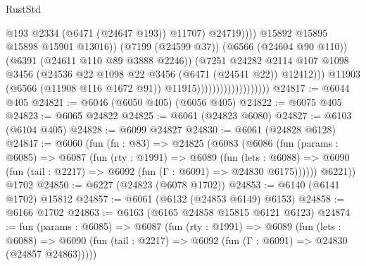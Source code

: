 \begin{lexlean}{RustStd}
\begin{coremodule}
                                                          @193
                                                          @2334
                                                          (@6471 (@24647 @193))
                                                          @11707)
                                                        @24719))))
                                                @15892
                                                @15895
                                                @15898
                                                @15901
                                                @13016))
                                            (@7199 (@24599 @37))
                                            (@6566 (@24604 @90 @110))
                                            (@6391 (@24611 @110 @89 @3888 @2246))
                                            (@7251
                                              @24282
                                              @2114
                                              @107
                                              @1098
                                              @3456
                                              (@24536
                                                @22
                                                @1098
                                                @22
                                                @3456
                                                (@6471 (@24541 @22))
                                                @12412)))
                                          @11903
                                          (@6566 (@11908 @116 @1672 @91))
                                          @11915)))))))))))))))))))
@24817 := @6044 @405
@24821 := @6046 (@6050 @405) (@6056 @405)
@24822 := @6075 @405
@24823 := @6065 @24822
@24825 := @6061 (@24823 @6080)
@24827 := @6103 (@6104 @405)
@24828 := @6099 @24827
@24830 := @6061 (@24828 @6128)
@24847 := @6060
    (fun (fn : @83) =>
    @24825
      (@6083
        (@6086
          (fun (params : @6085) =>
          @6087
            (fun (rty : @1991) =>
            @6089
              (fun (lets : @6088) =>
              @6090 (fun (tail : @2217) => @6092 (fun (Γ : @6091) => @24830 @6175))))))
        @6221))
    @1702
@24850 := @6227 (@24823 (@6078 @1702))
@24853 := @6140 (@6141 @1702) @15812
@24857 := @6061 (@6132 (@24853 @6149) @6153)
@24858 := @6166 @1702
@24863 := @6163 (@6165 @24858 @15815 @6121 @6123)
@24874 := fun (params : @6085) =>
  @6087
    (fun (rty : @1991) =>
    @6089
      (fun (lets : @6088) =>
      @6090 (fun (tail : @2217) => @6092 (fun (Γ : @6091) => @24830 (@24857 @24863)))))

\end{coremodule}
\end{lexlean}
